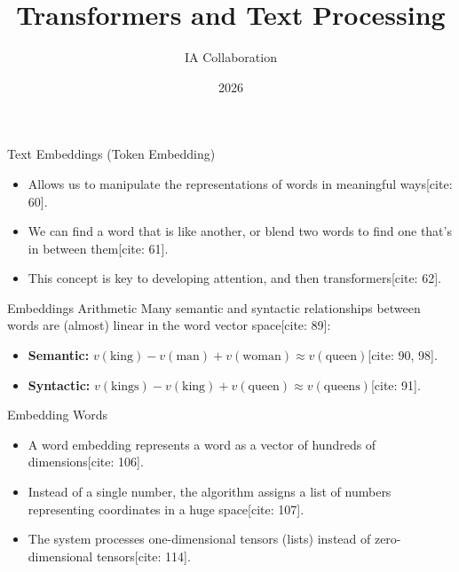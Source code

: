 \documentclass{beamer}
\title{Transformers and Text Processing}
\author{IA Collaboration}
\date{2026}
\begin{document}
	
	\frame{\titlepage}
	

	

	
	\begin{frame}{Text Embeddings (Token Embedding)}
		\begin{itemize}
			\item Allows us to manipulate the representations of words in meaningful ways[cite: 60].
			\item We can find a word that is like another, or blend two words to find one that's in between them[cite: 61].
			\item This concept is key to developing attention, and then transformers[cite: 62].
		\end{itemize}
		
		\vspace{0.3cm}
		\vspace{0.3cm}
	\end{frame}
	
	\begin{frame}{Embeddings Arithmetic}
		Many semantic and syntactic relationships between words are (almost) linear in the word vector space[cite: 89]:
		
		\begin{itemize}
			\item \textbf{Semantic:} $v(\text{king}) - v(\text{man}) + v(\text{woman}) \approx v(\text{queen})$[cite: 90, 98].
			\item \textbf{Syntactic:} $v(\text{kings}) - v(\text{king}) + v(\text{queen}) \approx v(\text{queens})$[cite: 91].
		\end{itemize}
		
		\vspace{0.3cm}
		\vspace{0.3cm}
		
	\end{frame}
	
	\begin{frame}{Embedding Words}
		\begin{itemize}
			\item A word embedding represents a word as a vector of hundreds of dimensions[cite: 106].
			\item Instead of a single number, the algorithm assigns a list of numbers representing coordinates in a huge space[cite: 107].
			\item The system processes one-dimensional tensors (lists) instead of zero-dimensional tensors[cite: 114].
		\end{itemize}
		
	\end{frame}
	
\end{document}
